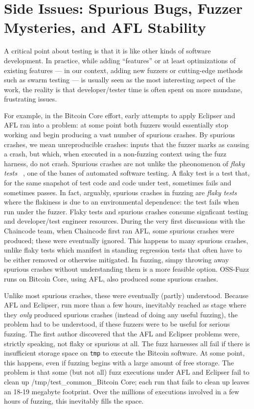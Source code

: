 \section{Side Issues: Spurious Bugs, Fuzzer Mysteries, and AFL Stability}

A critical point about testing is that it is like other kinds of
software development.  In practice, while adding ``features'' or at
least optimizations of existing features --- in our context, adding
new fuzzers or cutting-edge methods such as swarm testing --- is
usually seen as the most interesting aspect of the work, the reality
is that developer/tester time is often spent on more mundane,
frustrating issues.

For example, in the Bitcoin Core effort, early attempts to apply
Eclipser and AFL ran into a problem:  at some point both fuzzers would
essentially stop working and begin producing a vast number of spurious
crashes.  By spurious crashes, we mean unreproducible crashes: inputs
that the fuzzer marks as causing a crash, but which, when executed in
a non-fuzzing context using the fuzz harness, do not crash.  Spurious
crashes are not unlike the pheonomenon of \emph{flaky tests} ~\cite{flaky}, one of
the banes of automated software testing.  A flaky test is a test that, for the same
snapshot of test code and code under test, sometimes
fails and sometimes passes.  In fact, arguably, spurious crashes in
fuzzing are \emph{flaky tests} where the flakiness is due to an
environmental dependence: the test fails when run under the fuzzer.
Flaky tests and spurious crashes consume signficant testing and
developer/test engineer resources.  During the very first discussions
with the Chaincode team, when Chaincode first ran AFL, some spurious
crashes were produced; these were eventually ignored.  This happens to
many spurious crashes, unlike flaky tests which manifest in standing
regression tests that often have to be either removed or otherwise
mitigated.  In fuzzing, simpy throwing away spurious crashes without
understanding them is a more feasible option.
OSS-Fuzz runs on Bitcoin Core, using AFL, also produced some spurious
crashes.

Unlike most spurious crashes, these were eventually (partly)
understood.  Because AFL and Eclipser, run more than a few hours,
inevitably reached as stage where they \emph{only} produced spurious
crashes (instead of doing any useful fuzzing), the problem had to be
understood, if these fuzzers were to be useful for serious fuzzing.
The first author discovered that the AFL and Eclipser problems were,
strictly speaking, not flaky or spurious at all.  The fuzz harnesses
all fail if there is insufficient storage space on {\tt tmp} to
execute the Bitcoin software.  At some point, this happens, even if
fuzzing begins with a large amount of free storage.  The problem is
that some (but not all) fuzz executions under AFL and Eclipser fail to
clean up {/tmp/test\_common\_Bitcoin Core}; each run that fails to
clean up leaves an 18-19 megabyte footprint.  Over the millions of
executions involved in a few hours of fuzzing, this inevitably fills
the space.

